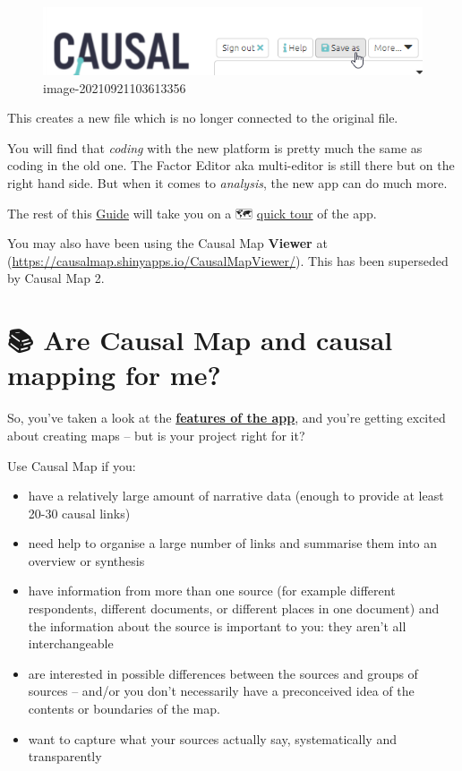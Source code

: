 \documentclass[
]{book}
\providecommand{\tightlist}{%
  \setlength{\itemsep}{0pt}\setlength{\parskip}{0pt}}
\begin{document}
\begin{figure}
\centering
\includegraphics[width=6.77083in,height=\textheight]{_assets/image-20210921103613356.png}
\caption{image-20210921103613356}
\end{figure}

This creates a new file which is no longer connected to the original file.

You will find that \emph{coding} with the new platform is pretty much the same as coding in the old one. The Factor Editor aka multi-editor is still there but on the right hand side. But when it comes to \emph{analysis}, the new app can do much more.

The rest of this \href{guide.causalmap.app}{Guide} will take you on a 🗺 \protect\hyperlink{quick-tour}{quick tour} of the app.

You may also have been using the Causal Map \textbf{Viewer} at (\url{https://causalmap.shinyapps.io/CausalMapViewer/}). This has been superseded by Causal Map 2.

\hypertarget{are-causal-map-and-causal-mapping-for-me}{%
\chapter{📚 Are Causal Map and causal mapping for me?}\label{are-causal-map-and-causal-mapping-for-me}}

So, you've taken a look at the \textbf{\href{https://causalmap.app/the-app/}{features of the app}}, and you're getting excited about creating maps -- but is your project right for it?

Use Causal Map if you:

\begin{itemize}
\tightlist
\item
  have a relatively large amount of narrative data (enough to provide at least 20-30 causal links)
\item
  need help to organise a large number of links and summarise them into an overview or synthesis
\item
  have information from more than one source (for example different respondents, different documents, or different places in one document) and the information about the source is important to you: they aren't all interchangeable
\item
  are interested in possible differences between the sources and groups of sources -- and/or you don't necessarily have a preconceived idea of the contents or boundaries of the map.
\item
  want to capture what your sources actually say, systematically and transparently
\end{itemize}
\end{document}
